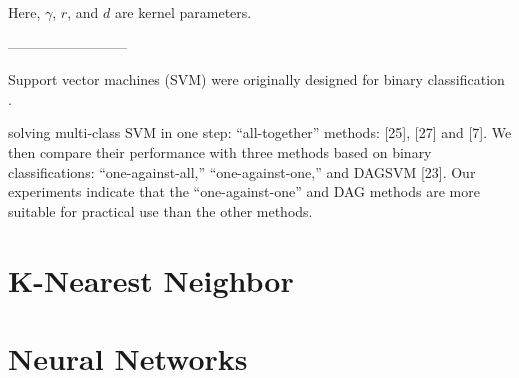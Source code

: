 Here, $\gamma$, $r$, and $d$ are kernel parameters.

--------------------------

Support vector machines (SVM) were originally designed for binary classification \cite{hsu2002comparison}.

solving multi-class SVM in one step: “all-together” methods: [25], [27] and [7]. We then compare their performance with three methods based on binary classifications: “one-against-all,” “one-against-one,” and DAGSVM [23]. Our experiments indicate that the “one-against-one” and DAG methods are more suitable for practical use than the other methods. 

\section{K-Nearest Neighbor}

\section{Neural Networks}
